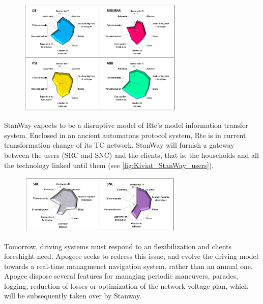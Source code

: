 \begin{figure}[h!]
    \centering
    \parbox[t]{0.7\textwidth}{
    \href{}{\includegraphics[width=0.7\textwidth]{0.figuras/Stanway_Kiviat_diagram_suppliers.png}}
    \label{fig:Kiviat_StanWay_supp}}
\end{figure}

StanWay expects to be a disruptive model of Rte's model information transfer system. Enclosed in an ancient automatons protocol system, Rte is in current transformation change of its TC network. StanWay will furnish a gateway between the users (SRC and SNC) and the clients, that is, the households and all the technology linked until them (see \autoref{fig:Kiviat_StanWay_users}).

\begin{figure}[h!]
    \centering
    \parbox[t]{0.7\textwidth}{
    \href{}{\includegraphics[width=0.7\textwidth]{0.figuras/Stanway_Kiviat_diagram_users.png}}
    \label{fig:Kiviat_StanWay_users}}
\end{figure}

\label{sec:approach:project-approach:parties:apogee}

Tomorrow, driving systems must respond to an flexibilization and clients foreshight need. Apogeee seeks to redress this issue, and evolve the driving model towards a real-time managmenet navigation system, rather than an annual one. Apogee dispose several features for managing periodic maneuvers, parades, logging, reduction of losses or optimization of the network voltage plan, which will be subsequently taken over by Stanway.

